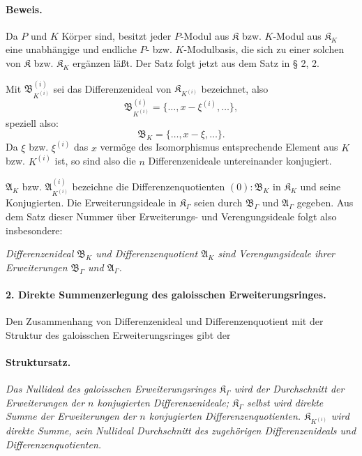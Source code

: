 \paragraph{Beweis.}
Da $P$ und $K$ Körper sind, besitzt jeder $P$-Modul aus $\mathfrak K$ bzw. $K$-Modul aus $\mathfrak K_K$ eine unabhängige und endliche $P$- bzw. $K$-Modulbasis, die sich zu einer solchen von $\mathfrak K$ bzw. $\mathfrak K_K$ ergänzen läßt. Der Satz folgt jetzt aus dem Satz in § 2, 2.

Mit $\mathfrak B_{K^{(i)}}^{(i)}$ sei das Differenzenideal von $\mathfrak K_{K^{(i)}}$ bezeichnet, also
\[
\mathfrak B_{K^{(i)}}^{(i)}=\{\ldots,x-\xi^{(i)},\ldots\},
\]
speziell also:
\[
\mathfrak B_K=\{\ldots,x-\xi,\ldots\}.
\]
Da $\xi$ bzw. $\xi^{(i)}$ das $x$ vermöge des Isomorphismus entsprechende Element aus $K$ bzw. $K^{(i)}$ ist, so sind also die $n$ Differenzenideale untereinander konjugiert.

$\mathfrak A_K$ bzw. $\mathfrak A_{K^{(i)}}^{(i)}$ bezeichne die Differenzenquotienten $(0):\mathfrak B_K$ in $\mathfrak K_K$ und seine Konjugierten. Die Erweiterungsideale in $\mathfrak K_\Gamma$ seien durch $\mathfrak B_\Gamma$ und $\mathfrak A_\Gamma$ gegeben. Aus dem Satz dieser Nummer über Erweiterungs- und Verengungsideale folgt also insbesondere:

\emph{Differenzenideal $\mathfrak B_K$ und Differenzenquotient $\mathfrak A_K$ sind Verengungsideale ihrer Erweiterungen $\mathfrak B_\Gamma$ und $\mathfrak A_\Gamma$.}

\paragraph{2. Direkte Summenzerlegung des galoisschen Erweiterungsringes.}
Den Zusammenhang von Differenzenideal und Differenzenquotient mit der Struktur des galoisschen Erweiterungsringes gibt der

\paragraph{Struktursatz.}
\emph{Das Nullideal des galoisschen Erweiterungsringes $\mathfrak K_\Gamma$ wird der Durchschnitt der Erweiterungen der $n$ konjugierten Differenzenideale; $\mathfrak K_\Gamma$ selbst wird direkte Summe der Erweiterungen der $n$ konjugierten Differenzenquotienten. $\mathfrak K_{K^{(i)}}$ wird direkte Summe, sein Nullideal Durchschnitt des zugehörigen Differenzenideals und Differenzenquotienten.}

